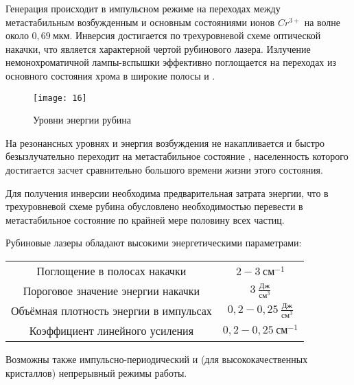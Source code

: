 Генерация происходит в импульсном режиме на переходах между метастабильным
возбужденным и основным состояниями ионов \( Cr^{3+} \) на волне около
\( 0,69~\text{мкм} \). Инверсия достигается по трехуровневой схеме оптической
накачки, что является характерной чертой рубинового лазера. Излучение
немонохроматичной лампы-вспышки эффективно поглощается на переходах из
основного состояния хрома  в широкие полосы
 и .

\begin{figure}[h]
    \center
    \texttt{[image: 16]}
    \caption{Уровни энергии рубина}
\end{figure}

На резонансных уровнях  и  энергия возбуждения не
накапливается и быстро безызлучательно переходит на метастабильное состояние
, населенность которого достигается засчет сравнительно большого
времени жизни этого состояния.

Для получения инверсии необходима предварительная затрата энергии, что в
трехуровневой схеме рубина обусловлено необходимостью перевести в метастабильное
состояние по крайней мере половину всех частиц.

Рубиновые лазеры обладают высокими энергетическими параметрами:
\begin{center}
    \begin{tabular}{|c|c|} \hline
        Поглощение в полосах накачки & \( 2-3~\text{см}^{-1} \) \\
        Пороговое значение энергии накачки &
            \( 3~\frac{\text{Дж}}{\text{см}^{3}} \) \\
        Объёмная плотность энергии в импульсах &
            \( 0,2-0,25~\frac{\text{Дж}}{\text{см}^{3}} \) \\
        Коэффициент линейного усиления & \( 0,2-0,25~\text{см}^{-1} \) \\
        \hline
    \end{tabular}
\end{center}

Возможны также импульсно-периодический и (для высококачественных кристаллов)
непрерывный режимы работы.

